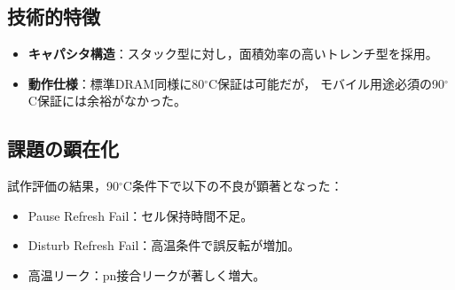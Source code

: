 \documentclass[conference]{IEEEtran}
\begin{document}
\subsection{技術的特徴}
\begin{itemize}
  \item \textbf{キャパシタ構造}：スタック型に対し，面積効率の高いトレンチ型を採用。
  \item \textbf{動作仕様}：標準DRAM同様に80$^\circ$C保証は可能だが，
        モバイル用途必須の90$^\circ$C保証には余裕がなかった。
\end{itemize}

\subsection{課題の顕在化}
試作評価の結果，90$^\circ$C条件下で以下の不良が顕著となった：
\begin{itemize}
  \item Pause Refresh Fail：セル保持時間不足。
  \item Disturb Refresh Fail：高温条件で誤反転が増加。
  \item 高温リーク：pn接合リークが著しく増大。
\end{itemize}
\end{document}
